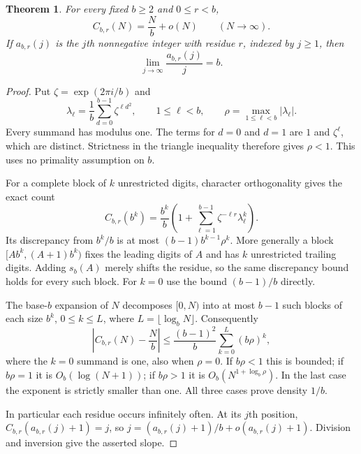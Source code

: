 \documentclass[10pt]{article}
\newtheorem{theorem}{Theorem}
\begin{document}
\begin{theorem}\label{thm:density}
For every fixed $b\ge2$ and $0\le r<b$,
\[
 C_{b,r}(N)=\frac Nb+o(N)\qquad(N\longrightarrow\infty).
\]
If $a_{b,r}(j)$ is the $j$th nonnegative integer with residue $r$,
indexed by $j\ge1$, then
\[
 \lim_{j\to\infty}\frac{a_{b,r}(j)}j=b.
\]
\end{theorem}
\begin{proof}
Put $\zeta=\exp(2\pi i/b)$ and
\[
 \lambda_\ell=\frac1b\sum_{d=0}^{b-1}\zeta^{\ell d^2},
 \qquad 1\le\ell<b,\qquad
 \rho=\max_{1\le\ell<b}|\lambda_\ell|.
\]
Every summand has modulus one. The terms for $d=0$ and $d=1$
are $1$ and $\zeta^\ell$, which are distinct. Strictness in the
triangle inequality therefore gives $\rho<1$. This uses no
primality assumption on $b$.

For a complete block of $k$ unrestricted digits, character
orthogonality gives the exact count
\begin{equation}\label{eq:fourier}
 C_{b,r}(b^k)=\frac{b^k}{b}
 \left(1+\sum_{\ell=1}^{b-1}\zeta^{-\ell r}\lambda_\ell^k\right).
\end{equation}
Its discrepancy from $b^k/b$ is at most
$(b-1)b^{k-1}\rho^k$. More generally a block
$[A b^k,(A+1)b^k)$ fixes the leading digits of $A$ and has
$k$ unrestricted trailing digits. Adding $s_b(A)$ merely shifts
the residue, so the same discrepancy bound holds for every such
block. For $k=0$ use the bound $(b-1)/b$ directly.

The base-$b$ expansion of $N$ decomposes $[0,N)$ into at most
$b-1$ such blocks of each size $b^k$, $0\le k\le L$, where
$L=\lfloor\log_b N\rfloor$. Consequently
\begin{equation}\label{eq:error}
 \left|C_{b,r}(N)-\frac Nb\right|
 \le\frac{(b-1)^2}{b}\sum_{k=0}^{L}(b\rho)^k,
\end{equation}
where the $k=0$ summand is one, also when $\rho=0$.
If $b\rho<1$ this is bounded; if $b\rho=1$ it is
$O_b(\log(N+1))$; if $b\rho>1$ it is
$O_b(N^{1+\log_b\rho})$. In the last case the exponent is
strictly smaller than one. All three cases prove density $1/b$.

In particular each residue occurs infinitely often. At its $j$th
position, $C_{b,r}(a_{b,r}(j)+1)=j$, so
$j=(a_{b,r}(j)+1)/b+o(a_{b,r}(j)+1)$. Division and inversion
give the asserted slope.
\end{proof}
\end{document}
